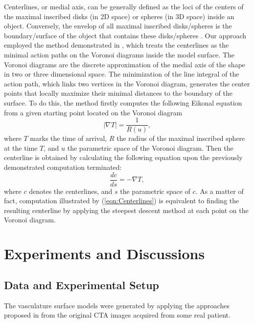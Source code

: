 Centerlines, or medial axis, can be generally defined as the loci of the centers of the maximal inscribed disks (in 2D space) or spheres (in 3D space) inside an object.
Conversely, the envelop of all maximal inscribed disks/spheres is the boundary/surface of the object that contains these disks/spheres \cite{Amenta2001}.
Our approach employed the method demonstrated in \cite{Antiga2003}, which treats the centerlines as the minimal action paths on the Voronoi diagrams inside the model surface.
The Voronoi diagrams are the discrete approximation of the medial axis of the shape in two or three dimensional space.
The minimization of the line integral of the action path, which links two vertices in the Voronoi diagram, generates the center points that locally maximize their minimal distances to the boundary of the surface.
To do this, the method firstly computes the following Eikonal equation from a given starting point located on the Voronoi diagram
\begin{equation}
\label{eqn:Voronoi}
\left| \nabla T \right| = \frac{1}{R(u)},
\end{equation}
where $T$ marks the time of arrival, $R$ the radius of the maximal inscribed sphere at the time $T$, and $u$ the parametric space of the Voronoi diagram.
Then the centerline is obtained by calculating the following equation upon the previously demonstrated computation terminated:
\begin{equation}
\label{eqn:Centerlines}
\frac{dc}{ds} = - \nabla T,
\end{equation}
where $c$ denotes the centerlines, and $s$ the parametric space of $c$.
As a matter of fact, computation illustrated by (\ref{eqn:Centerlines}) is equivalent to finding the resulting centerline by applying the steepest descent method at each point on the Voronoi diagram.

\section{Experiments and Discussions}

\subsection{Data and Experimental Setup}

The vasculature surface models were generated by applying the approaches proposed in \cite{Yang2014ICRA} from the original CTA images acquired from some real patient.

